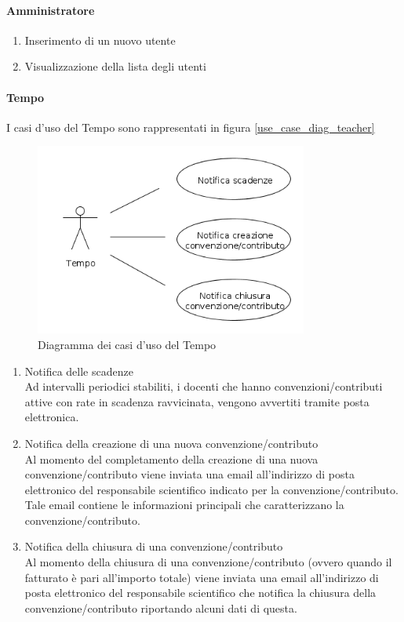 \paragraph{Amministratore}
\begin{enumerate}
 \item Inserimento di un nuovo utente
 \item Visualizzazione della lista degli utenti
\end{enumerate}

\paragraph{Tempo}
I casi d'uso del Tempo sono rappresentati in figura \ref{use_case_diag_teacher}
\begin{figure}[h]
  \caption{Diagramma dei casi d'uso del Tempo}
  \label{use_case_diag_time}
  \centering
    \includegraphics[width=0.8\textwidth]{images/casi_uso_tempo.png}
\end{figure}
\begin{enumerate}
 \item Notifica delle scadenze\\
 
    Ad intervalli periodici stabiliti, i docenti che hanno convenzioni/contributi attive con rate in scadenza ravvicinata, vengono avvertiti tramite posta elettronica.
  
 
 \item Notifica della creazione di una nuova convenzione/contributo\\
 
    Al momento del completamento della creazione di una nuova convenzione/contributo viene inviata una email all'indirizzo di posta elettronico del responsabile scientifico indicato per la convenzione/contributo. Tale email contiene
    le informazioni principali che caratterizzano la convenzione/contributo.
  
  
 \item Notifica della chiusura di una convenzione/contributo\\
 
    Al momento della chiusura di una convenzione/contributo (ovvero quando il fatturato è pari all'importo totale) viene inviata una email all'indirizzo di posta elettronico del responsabile scientifico che notifica la chiusura della
    convenzione/contributo riportando alcuni dati di questa.
\end{enumerate}




